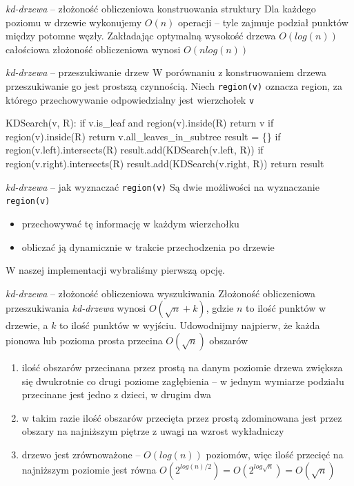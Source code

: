 \documentclass{beamer}
\begin{document}
\begin{frame}{\textit{kd-drzewa} -- złożoność obliczeniowa konstruowania struktury}
    Dla każdego poziomu w drzewie wykonujemy $O(n)$ operacji -- tyle zajmuje podział punktów między potomne węzły. Zakładając optymalną wysokość drzewa $O(log(n))$ całościowa złożoność obliczeniowa wynosi $O(nlog(n))$
\end{frame}

\begin{frame}[fragile]{\textit{kd-drzewa} -- przeszukiwanie drzew}
    W porównaniu z konstruowaniem drzewa przeszukiwanie go jest prostszą czynnością. Niech \texttt{region(v)} oznacza region, za którego przechowywanie odpowiedzialny jest wierzchołek \texttt{v}
    \begin{semiverbatim}
    KDSearch(v, R):
        if v.is_leaf and region(v).inside(R)
            return v
        if region(v).inside(R)
            return v.all_leaves_in_subtree
        result = \{\}
        if region(v.left).intersects(R)
            result.add(KDSearch(v.left, R))
        if region(v.right).intersects(R)
            result.add(KDSearch(v.right, R))
        return result
    \end{semiverbatim}
\end{frame}

\begin{frame}{\textit{kd-drzewa} -- jak wyznaczać \texttt{region(v)}}
    Są dwie możliwości na wyznaczanie \texttt{region(v)}
    \begin{itemize}
        \item przechowywać tę informację w każdym wierzchołku
        \item obliczać ją dynamicznie w trakcie przechodzenia po drzewie
    \end{itemize}
    W naszej implementacji wybraliśmy pierwszą opcję.
\end{frame}

\begin{frame}{\textit{kd-drzewa} -- złożoność obliczeniowa wyszukiwania}
    Złożoność obliczeniowa przeszukiwania \textit{kd-drzewa} wynosi $O(\sqrt{n} + k)$, gdzie $n$ to ilość punktów w drzewie, a $k$ to ilość punktów w wyjściu. Udowodnijmy najpierw, że każda pionowa lub pozioma prosta przecina $O(\sqrt{n})$ obszarów
    \begin{enumerate}
            \item<2-> ilość obszarów przecinana przez prostą na danym poziomie drzewa zwiększa się dwukrotnie co drugi poziome zagłębienia -- w jednym wymiarze podziału przecinane jest jedno z dzieci, w drugim dwa 
            \item<3-> w takim razie ilość obszarów przecięta przez prostą zdominowana jest przez obszary na najniższym piętrze z uwagi na wzrost wykładniczy
            \item<4-> drzewo jest zrównoważone -- $O(log(n))$ poziomów, więc ilość przecięć na najniższym poziomie jest równa $O(2^{log(n)/2}) = O(2^{log\sqrt{n}}) = O(\sqrt{n})$
    \end{enumerate}
\end{frame}
\end{document}
